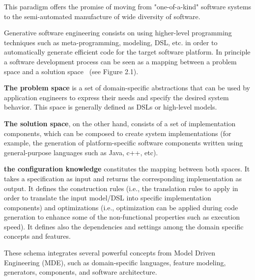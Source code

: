 This paradigm offers the promise of moving from "one-of-a-kind" software systems to the semi-automated manufacture of wide diversity of software.

Generative software engineering consists on using higher-level programming techniques such as meta-programming, modeling, DSL, etc. in order to automatically generate efficient code for the target software platform. 
In principle a software development process can be seen as a mapping between a problem space and a solution space~\cite{czarnecki2005overview} (see Figure 2.1). 

\textbf{The problem space} is a set of domain-specific abstractions that can be used by application engineers to express their needs and specify the desired system behavior. This space is generally defined  as DSLs or high-level models. 

\textbf{The solution space}, on the other hand, consists of a set of implementation components, which can be composed to create system implementations (for example, the generation of platform-specific software components written using general-purpose languages such as Java, c++, etc).

\textbf{the configuration knowledge} constitutes the mapping between both spaces. It takes a specification as input and returns the corresponding implementation as output. It defines the construction rules (i.e., the translation rules to apply in order to translate the input model/DSL into specific implementation components) and optimizations (i.e., optimization can be applied during code generation to enhance some of the non-functional properties such as execution speed). It defines also the dependencies and settings among the domain specific concepts and features.


These schema integrates several powerful concepts from Model Driven Engineering (MDE), such as domain-specific languages, feature modeling, generators, components, and software architecture. 

